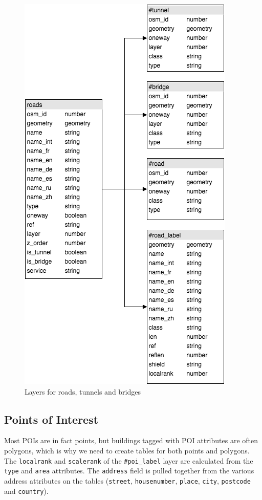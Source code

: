 \begin{figure}[h]
  \centering
  \includegraphics[scale=0.6]{images/road_layer.png}
  \caption{Layers for roads, tunnels and bridges}
\end{figure}

\newpage
\subsection{Points of Interest}
Most POIs are in fact points, but buildings tagged with POI attributes
are often polygons, which is why we need to create tables for both points and polygons.
The \texttt{localrank} and \texttt{scalerank} of the \texttt{\#poi\_label} layer are calculated from the \texttt{type} and \texttt{area} attributes.
The \texttt{address} field is pulled together from the various address attributes on the tables (\texttt{street}, \texttt{housenumber}, \texttt{place}, \texttt{city}, \texttt{postcode} and \texttt{country}).

